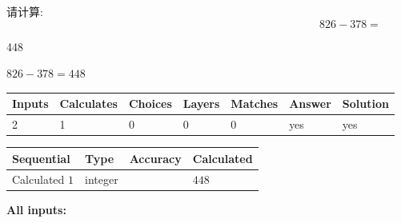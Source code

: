 \documentclass{ctexart}
\begin{document}
  
 
请计算:
\begin{equation}
826 -   %
378 = \nonumber
\end{equation}
 
 
 
\noindent{}
 
 

448
 
 
\noindent{}
 
 

 
 
 
\noindent{}
 
 

$ %
826 -  %
378=   %
448$
 
 
\noindent{}
 
 

 
   
   
   
   
\noindent\begin{tabular}{|l|l|l|l|l|l|l|}
 \hline
Inputs & Calculates & Choices & Layers & Matches & Answer & Solution \\ \hline
 2  & 
 1  & 
 0
  & 
 0  & 
 0  & 
  yes & 
  yes 
  \\ \hline
 \end{tabular}
   
   
   
   
\noindent{}
   
   
  
  
\noindent\begin{tabular}{|l|l|l|l|}
\hline
 Sequential & Type & Accuracy & Calculated \\ 
\hline
 
 
  Calculated $  1 $ & integer &  & 
  $ 448 $ 
 \\  \hline  
 \end{tabular}
   
   
   
   
\noindent\vspace{0.1in}\hspace{-0.08in} {\textbf{\Large{All inputs: }}}
   
\end{document}
